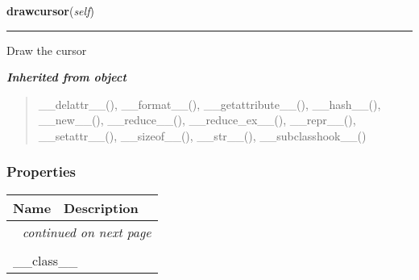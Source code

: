 \hspace{.8\funcindent}\begin{boxedminipage}{\funcwidth}

    \raggedright \textbf{drawcursor}(\textit{self})

    \vspace{-1.5ex}

    \rule{\textwidth}{0.5\fboxrule}
\setlength{\parskip}{2ex}
    Draw the cursor

\setlength{\parskip}{1ex}
    \end{boxedminipage}


\large{\textbf{\textit{Inherited from object}}}

\begin{quote}
\_\_delattr\_\_(), \_\_format\_\_(), \_\_getattribute\_\_(), \_\_hash\_\_(), \_\_new\_\_(), \_\_reduce\_\_(), \_\_reduce\_ex\_\_(), \_\_repr\_\_(), \_\_setattr\_\_(), \_\_sizeof\_\_(), \_\_str\_\_(), \_\_subclasshook\_\_()
\end{quote}


  \subsubsection{Properties}

    \vspace{-1cm}
\hspace{\varindent}\begin{longtable}{|p{\varnamewidth}|p{\vardescrwidth}|l}
\cline{1-2}
\cline{1-2} \centering \textbf{Name} & \centering \textbf{Description}& \\
\cline{1-2}
\endhead\cline{1-2}\multicolumn{3}{r}{\small\textit{continued on next page}}\\\endfoot\cline{1-2}
\endlastfoot\multicolumn{2}{|l|}{\textit{Inherited from object}}\\
\multicolumn{2}{|p{\varwidth}|}{\raggedright \_\_class\_\_}\\
\cline{1-2}
\end{longtable}



